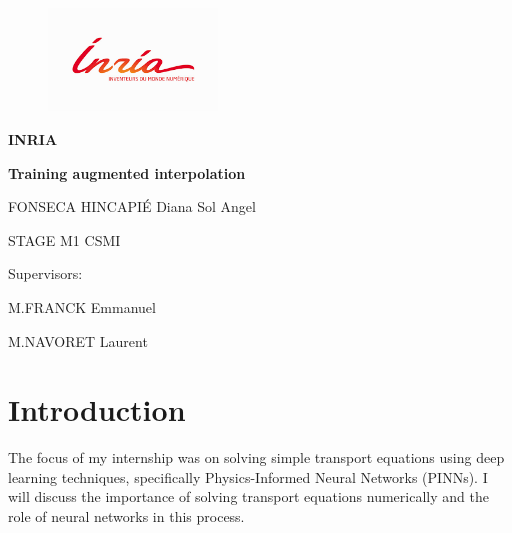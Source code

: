\documentclass{article}
\begin{document}
\begin{titlepage}
\begin{figure} 
\includegraphics[width=0.4\textwidth]{images/inria.png}
    \centering
\end{figure}

\centering
\title{}\author{}\date{}
\centering
\vspace{3cm}
{\bfseries\LARGE INRIA \par} %
\vspace{4cm}
{\bfseries\LARGE Training augmented interpolation \par}
\vspace{1cm}
{\Large FONSECA HINCAPIÉ Diana Sol Angel\par}
\vspace{1cm}
{\Large STAGE M1 CSMI \par}
\vspace{3cm}
{\Large Supervisors: \par}
\vspace{0.5cm}
{\Large M.FRANCK Emmanuel\par}
\vspace{0.5cm}
{\Large M.NAVORET Laurent\par}
\end{titlepage}


\maketitle
\tableofcontents 
\newpage






\section{Introduction}
The focus of my internship was on solving simple transport equations using deep learning techniques, specifically Physics-Informed Neural Networks (PINNs). I will discuss the importance of solving transport equations numerically and the role of neural networks in this process.
\end{document}
